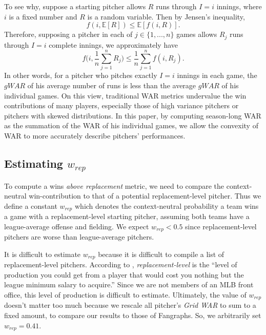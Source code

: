 \documentclass[12pt]{article}
\newcommand{\E}{{\mathbb E}}
\begin{document}
To see why, suppose a starting pitcher allows $R$ runs through $I = i$ innings, where $i$ is a fixed number and $R$ is a random variable. Then by Jensen's inequality, 
\begin{equation}
f(i, \E[R]) \leq \E[f(i,R)].
\label{eqn:jensen1}
\end{equation}
Therefore, supposing a pitcher in each of $j \in \{1,...,n\}$ games allows $R_j$ runs through $I=i$ complete innings, we approximately have
\begin{equation}
f\bigg(i, \frac{1}{n}\sum_{j=1}^{n} R_j\bigg) \leq \frac{1}{n}\sum_{j=1}^{n} f(i,R_j).
\label{eqn:jensen2}
\end{equation}
In other words, for a pitcher who pitches exactly $I=i$ innings in each game, the $gWAR$ of his average number of runs is less than the average $gWAR$ of his individual games. On this view, traditional WAR metrics undervalue the win contributions of many players, especially those of high variance pitchers or pitchers with skewed distributions. In this paper, by computing season-long WAR as the summation of the WAR of his individual games, we allow the convexity of WAR to more accurately describe pitchers' performances. 

\subsection{Estimating $w_{rep}$}

To compute a wins \textit{above replacement} metric, we need to compare the context-neutral win-contribution to that of a potential replacement-level pitcher. Thus we define a constant $w_{rep}$ which denotes the context-neutral probability a team wins a game with a replacement-level starting pitcher, assuming both teams have a league-average offense and fielding. We expect $w_{rep} < 0.5$ since replacement-level pitchers are worse than league-average pitchers. 

It is difficult to estimate $w_{rep}$ because it is difficult to compile a list of replacement-level pitchers. According to \citet{ReplacementLevel}, \textit{replacement-level} is the ``level of production you could get from a player that would cost you nothing but the league minimum salary to acquire.'' Since we are not members of an MLB front office, this level of production is difficult to estimate. Ultimately, the value of $w_{rep}$ doesn't matter too much because we rescale all pitcher's \textit{Grid WAR} to sum to a fixed amount, to compare our results to those of Fangraphs. So, we arbitrarily set $w_{rep} = 0.41$. 
\end{document}
